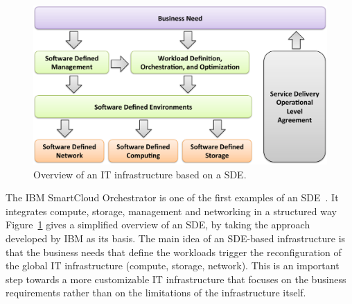%
%

\begin{figure}[ht!]
\centering
\includegraphics[width=0.95\columnwidth]{figures/fig10_sde_enabled_IT.pdf}
\caption{Overview of an IT infrastructure based on a SDE.}
\label{fig:SDEenabledIT}
\end{figure}


The IBM SmartCloud Orchestrator is one of the first examples of an SDE~\cite{li2014,racherla2014}.
It integrates compute, storage, management and networking in a structured way
Figure~\ref{fig:SDEenabledIT} gives a simplified overview of an SDE, by taking the approach developed by IBM as its basis.
The main idea of an SDE-based infrastructure is that the business needs that define the workloads trigger the reconfiguration of the global IT infrastructure (compute, storage, network). 
This is an important step towards a more customizable IT infrastructure that focuses on the business requirements rather than on the limitations of the infrastructure itself.




